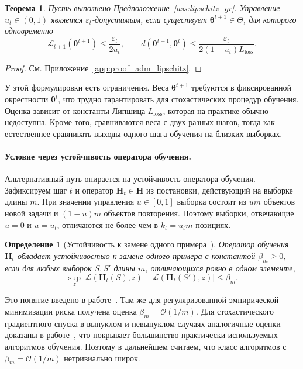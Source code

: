 \documentclass[a4paper,14pt,oneside,openany]{extarticle}
\newtheorem{theorem}{Теорема}
\newtheorem{definition}{Определение}
\newcommand{\bH}{\mathbf{H}}
\newcommand{\cL}{\mathcal{L}}
\newcommand{\btheta}{\boldsymbol{\theta}}
\begin{document}
\begin{theorem}\label{thm:adm_lipschitz}
    Пусть выполнено Предположение~\ref{ass:lipschitz_gr}. Управление $u_t \in (0, 1)$ является $\varepsilon_t$-допустимым, если существует $\btheta^{t+1} \in \Theta$, для которого одновременно
    \[
        \cL_{t+1}(\btheta^{t+1}) \le \frac{\varepsilon_t}{2 u_t}, \qquad d(\btheta^{t+1}, \btheta^t) \le \frac{\varepsilon_t}{2(1 - u_t) L_{\text{loss}}}.
    \]
\end{theorem}

\begin{proof}См. Приложение~\ref{app:proof_adm_lipschitz}.\end{proof}

У этой формулировки есть ограничения. Веса $\btheta^{t+1}$ требуются в фиксированной окрестности $\btheta^t$, что трудно гарантировать для стохастических процедур обучения. Оценка зависит от константы Липшица $L_{\text{loss}}$, которая на практике обычно недоступна. Кроме того, сравниваются веса с двух разных шагов, тогда как естественнее сравнивать выходы одного шага обучения на близких выборках.

\paragraph{Условие через устойчивость оператора обучения.}
Альтернативный путь опирается на устойчивость оператора обучения. Зафиксируем шаг $t$ и оператор $\bH_t \in \bH$ из постановки, действующий на выборке длины $m$. При значении управления $u \in [0, 1]$ выборка состоит из $u m$ объектов новой задачи и $(1 - u) m$ объектов повторения. Поэтому выборки, отвечающие $u = 0$ и $u = u_t$, отличаются не более чем в $k_t = u_t m$ позициях.

\begin{definition}[Устойчивость к замене одного примера~\cite{bousquet2002stability}]\label{def:beta_stab_gr}
    Оператор обучения $\bH_t$ обладает устойчивостью к замене одного примера с константой $\beta_m \ge 0$, если для любых выборок $S, S'$ длины $m$, отличающихся ровно в одном элементе,
    \[
        \sup_z \bigl|\cL(\bH_t(S), z) - \cL(\bH_t(S'), z)\bigr| \le \beta_m.
    \]
\end{definition}

Это понятие введено в работе~\cite{bousquet2002stability}. Там же для регуляризованной эмпирической минимизации риска получена оценка $\beta_m = \mathcal{O}(1/m)$. Для стохастического градиентного спуска в выпуклом и невыпуклом случаях аналогичные оценки доказаны в работе~\cite{hardt2016train}, что покрывает большинство практически используемых алгоритмов обучения. Поэтому в дальнейшем считаем, что класс алгоритмов с $\beta_m = \mathcal{O}(1/m)$ нетривиально широк.
\end{document}

